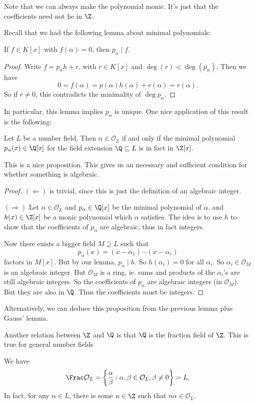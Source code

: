 \documentclass[a4paper]{article}
\begin{document}
Note that we can always make the polynomial monic. It's just that the coefficients need not lie in $\Z$.

Recall that we had the following lemma about minimal polynomials:
\begin{lemma}
  If $f \in K[x]$ with $f(\alpha) = 0$, then $p_\alpha \mid f$.
\end{lemma}

\begin{proof}
  Write $f = p_\alpha h + r$, with $r \in K[x]$ and $\deg(r) < \deg (p_\alpha)$. Then we have
  \[
    0 = f(\alpha) = p(\alpha) h(\alpha) + r(\alpha) = r(\alpha).
  \]
  So if $r \not= 0$, this contradicts the minimality of $\deg p_\alpha$.
\end{proof}

In particular, this lemma implies $p_\alpha$ is unique. One nice application of this result is the following:
\begin{prop}
  Let $L$ be a number field. Then $\alpha \in \mathcal{O}_L$ if and only if the minimal polynomial $p_\alpha(x) \in \Q[x]$ for the field extension $\Q \subseteq L$ is in fact in $\Z[x]$.
\end{prop}
This is a nice proposition. This gives us an necessary and sufficient condition for whether something is algebraic.
\begin{proof}
  $(\Leftarrow)$ is trivial, since this is just the definition of an algebraic integer.

  $(\Rightarrow)$ Let $\alpha \in \mathcal{O}_L$ and $p_\alpha \in \Q[x]$ be the minimal polynomial of $\alpha$, and $h(x) \in \Z[x]$ be a monic polynomial which $\alpha$ satisfies. The idea is to use $h$ to show that the coefficients of $p_\alpha$ are algebraic, thus in fact integers.

  Now there exists a bigger field $M \supseteq L$ such that
  \[
    p_\alpha(x) = (x - \alpha_1) \cdots (x - \alpha_r)
  \]
  factors in $M[x]$. But by our lemma, $p_\alpha \mid h$. So $h(\alpha_i) = 0$ for all $\alpha_i$. So $\alpha_i \in \mathcal{O}_M$ is an algebraic integer. But $\mathcal{O}_M$ is a ring, ie. sums and products of the $\alpha_i$'s are still algebraic integers. So the coefficients of $p_\alpha$ are algebraic integers (in $\mathcal{O}_M$). But they are also in $\Q$. Thus the coefficients must be integers.
\end{proof}
Alternatively, we can deduce this proposition from the previous lemma plus Gauss' lemma.

Another relation between $\Z$ and $\Q$ is that $\Q$ is the fraction field of $\Z$. This is true for general number fields
\begin{lemma}
  We have
  \[
    \Frac \mathcal{O}_L = \left\{\frac{\alpha}{\beta}: \alpha, \beta \in \mathcal{O}_L, \beta \not= 0\right\} = L.
  \]
  In fact, for any $\alpha \in L$, there is some $n \in \Z$ such that $n\alpha \in \mathcal{O}_L$.
\end{lemma}
\end{document}
